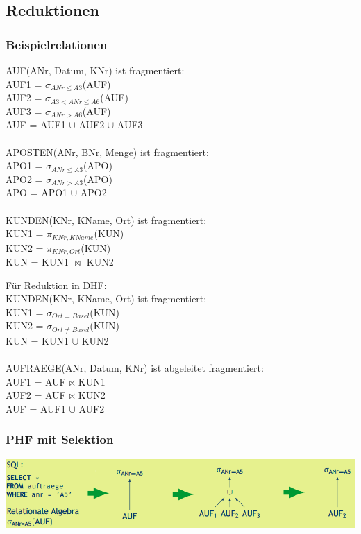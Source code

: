 \documentclass[a4paper,11pt]{article}
\begin{document}
\subsection{Reduktionen}
\subsubsection{Beispielrelationen}
\begin{minipage}[t]{0.45\textwidth}
AUF(ANr, Datum, KNr) ist fragmentiert:\\
AUF1 = $\sigma_{ANr \leq A3}$(AUF)\\
AUF2 = $\sigma_{A3<ANr \leq A6}$(AUF)\\
AUF3 = $\sigma_{ANr>A6}$(AUF)\\
AUF = AUF1 $\cup$ AUF2 $\cup$ AUF3\\
\\
APOSTEN(ANr, BNr, Menge) ist fragmentiert:\\
APO1 = $\sigma_{ANr \leq A3}$(APO)\\
APO2 = $\sigma_{ANr>A3}$(APO)\\
APO = APO1 $\cup$ APO2\\
\\
KUNDEN(KNr, KName, Ort) ist fragmentiert:\\
KUN1 = $\pi_{KNr,KName}$(KUN)\\
KUN2 = $\pi_{KNr,Ort}$(KUN)\\
KUN = KUN1 $\bowtie$ KUN2\\
\end{minipage}
\hspace{0.1\textwidth}
\begin{minipage}[t]{0.45\textwidth}
Für Reduktion in DHF:\\
KUNDEN(KNr, KName, Ort) ist fragmentiert:\\
KUN1 = $\sigma_{Ort=Basel}$(KUN)\\
KUN2 = $\sigma_{Ort \neq Basel}$(KUN)\\
KUN = KUN1 $\cup$ KUN2\\
\\
AUFRAEGE(ANr, Datum, KNr) ist abgeleitet fragmentiert:\\
AUF1 = AUF $\ltimes$ KUN1\\
AUF2 = AUF $\ltimes$ KUN2\\
AUF = AUF1 $\cup$ AUF2
\end{minipage}
\subsubsection{PHF mit Selektion}
\includegraphics[scale=0.7]{src/phf_select.png}
\end{document}
